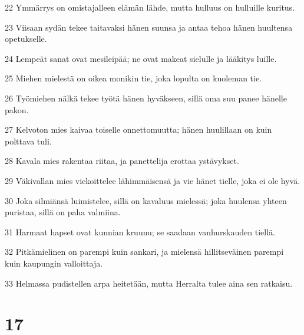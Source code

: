 \par 22 Ymmärrys on omistajalleen elämän lähde, mutta hulluus on hulluille kuritus.
\par 23 Viisaan sydän tekee taitavaksi hänen suunsa ja antaa tehoa hänen huultensa opetukselle.
\par 24 Lempeät sanat ovat mesileipää; ne ovat makeat sielulle ja lääkitys luille.
\par 25 Miehen mielestä on oikea monikin tie, joka lopulta on kuoleman tie.
\par 26 Työmiehen nälkä tekee työtä hänen hyväkseen, sillä oma suu panee hänelle pakon.
\par 27 Kelvoton mies kaivaa toiselle onnettomuutta; hänen huulillaan on kuin polttava tuli.
\par 28 Kavala mies rakentaa riitaa, ja panettelija erottaa ystävykset.
\par 29 Väkivallan mies viekoittelee lähimmäisensä ja vie hänet tielle, joka ei ole hyvä.
\par 30 Joka silmiänsä luimistelee, sillä on kavaluus mielessä; joka huulensa yhteen puristaa, sillä on paha valmiina.
\par 31 Harmaat hapset ovat kunnian kruunu; se saadaan vanhurskauden tiellä.
\par 32 Pitkämielinen on parempi kuin sankari, ja mielensä hillitseväinen parempi kuin kaupungin valloittaja.
\par 33 Helmassa pudistellen arpa heitetään, mutta Herralta tulee aina sen ratkaisu.

\chapter{17}

